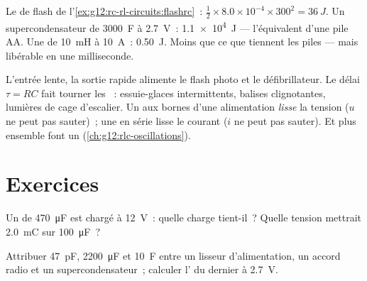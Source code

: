 \begin{example}\label{ex:g12:rc-rl-circuits:energies}
Le  de flash de
l'\cref{ex:g12:rc-rl-circuits:flashrc}~:
$\tfrac12 \times 8.0\times10^{-4} \times 300^2 = \qty{36}{J}$. Un
supercondensateur de \qty{3000}{F} à \qty{2.7}{V}~: \qty{1.1e4}{J} ---
l'équivalent d'une pile AA. Une  de \qty{10}{mH} à
\qty{10}{A}~: \qty{0.50}{J}. Moins que ce que tiennent les piles ---
mais libérable en une milliseconde.
\end{example}

\begin{remark}\label{rem:g12:rc-rl-circuits:applications}
L'entrée lente, la sortie rapide alimente le flash photo et le
défibrillateur. Le délai $\tau = RC$ fait tourner les
~: essuie-glaces
intermittents, balises clignotantes, lumières de cage d'escalier. Un
 aux bornes d'une alimentation
\emph{lisse} la tension ($u$ ne peut pas sauter)~; une
 en série lisse le courant ($i$ ne peut pas sauter).
Et  plus  ensemble font un
 (\cref{ch:g12:rlc-oscillations}).
\end{remark}

\section{Exercices}

\begin{exercise}[$\star$]\label{exo:g12:rc-rl-circuits:1}
Un  de \qty{470}{\micro F} est chargé à
\qty{12}{V}~: quelle charge tient-il~? Quelle
tension mettrait \qty{2.0}{mC} sur
\qty{100}{\micro F}~?
\end{exercise}

\begin{exercise}[$\star$]\label{exo:g12:rc-rl-circuits:2}
Attribuer \qty{47}{pF}, \qty{2200}{\micro F} et \qty{10}{F} entre un
lisseur d'alimentation, un accord radio et un supercondensateur~;
calculer l' du dernier à \qty{2.7}{V}.
\end{exercise}


